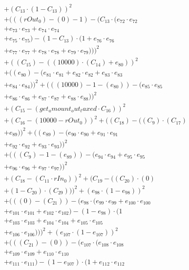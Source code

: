 \documentclass[10pt, a4paper]{article}
\begin{document}
\begin{align*}
& + (C_{13} \cdot (1 - C_{13}))^{2} \\
& + (((rOut_0) - (0) - 1) - (C_{13} \cdot (e_{72} \cdot e_{72} \\
& + e_{73} \cdot e_{73} + e_{74} \cdot e_{74} \\
& + e_{75} \cdot e_{75}) - (1 - C_{13}) \cdot (1 + e_{76} \cdot e_{76} \\
& + e_{77} \cdot e_{77} + e_{78} \cdot e_{78} + e_{79} \cdot e_{79})))^{2} \\
& + ((C_{15}) - ((10000)  \cdot  (C_{14}) + e_{80}))^{2} \\
& + ((e_{80}) - (e_{81} \cdot e_{81} + e_{82} \cdot e_{82} + e_{83} \cdot e_{83} \\
& + e_{84} \cdot e_{84}))^{2} + (((10000) - 1 - (e_{80})) - (e_{85} \cdot e_{85} \\
& + e_{86} \cdot e_{86} + e_{87} \cdot e_{87} + e_{88} \cdot e_{88}))^{2} \\
& + (C_{15} - (get_amount_out_taxed  \cdot  C_{16}))^{2} \\
& + (C_{16} - (10000 - rOut_0))^{2} + ((C_{18}) - ((C_{9})  \cdot  (C_{17}) \\
& + e_{89}))^{2} + ((e_{89}) - (e_{90} \cdot e_{90} + e_{91} \cdot e_{91} \\
& + e_{92} \cdot e_{92} + e_{93} \cdot e_{93}))^{2} \\
& + (((C_{9}) - 1 - (e_{89})) - (e_{94} \cdot e_{94} + e_{95} \cdot e_{95} \\
& + e_{96} \cdot e_{96} + e_{97} \cdot e_{97}))^{2} \\
& + (C_{18} - (C_{11}  \cdot  rIn_0))^{2} + (C_{19} - ((C_{20})  \cdot  (0) \\
& + (1 - C_{20})  \cdot  (C_{29})))^{2} + (e_{98} \cdot (1 - e_{98}))^{2} \\
& + (((0) - (C_{21})) - (e_{98} \cdot (e_{99} \cdot e_{99} + e_{100} \cdot e_{100} \\
& + e_{101} \cdot e_{101} + e_{102} \cdot e_{102}) - (1 - e_{98}) \cdot (1 \\
& + e_{103} \cdot e_{103} + e_{104} \cdot e_{104} + e_{105} \cdot e_{105} \\
& + e_{106} \cdot e_{106})))^{2} + (e_{107} \cdot (1 - e_{107}))^{2} \\
& + (((C_{21}) - (0)) - (e_{107} \cdot (e_{108} \cdot e_{108} \\
& + e_{109} \cdot e_{109} + e_{110} \cdot e_{110} \\
& + e_{111} \cdot e_{111}) - (1 - e_{107}) \cdot (1 + e_{112} \cdot e_{112} \\

\end{align*}
\end{document}
